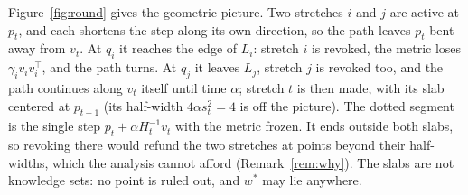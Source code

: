 \documentclass[11pt]{article}
\theoremstyle{plain}
\theoremstyle{definition}
\theoremstyle{remark}
\newcommand{\wstar}{w^{\ast}}
\begin{document}
Figure~\ref{fig:round} gives the geometric picture. Two stretches $i$ and $j$ are active at $p_t$,
and each shortens the step along its own direction, so the path leaves $p_t$ bent away from $v_t$.
At $q_i$ it reaches the edge of $L_i$: stretch $i$ is revoked, the metric loses
$\gamma_iv_iv_i^{\top}$, and the path turns. At $q_j$ it leaves $L_j$, stretch $j$ is revoked too,
and the path continues along $v_t$ itself until time $\alpha$; stretch $t$ is then
made, with its slab centered at $p_{t+1}$ (its half-width $4\alpha s_t^{2}=4$ is off the picture).
The dotted segment is the single step $p_t+\alpha H_t^{-1}v_t$ with the metric frozen. It ends
outside both slabs, so revoking there would refund the two stretches at points beyond their
half-widths, which the analysis cannot afford (Remark~\ref{rem:why}). The slabs are not knowledge
sets: no point is ruled out, and $\wstar$ may lie anywhere.

\iffalse
\end{document}
